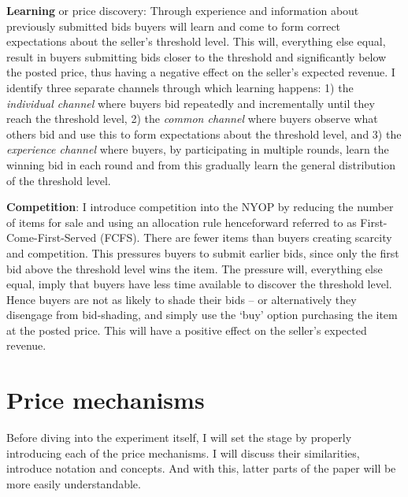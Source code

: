 \documentclass[a4paper,12pt]{article}
\begin{document}
{\bf Learning} or price discovery: Through experience and information about previously submitted bids buyers will learn and come to form correct expectations about the seller's threshold level. This will, everything else equal, result in buyers submitting bids closer to the threshold and significantly below the posted price, thus having a negative effect on the seller's expected revenue. I identify three separate channels through which learning happens: 1) the \emph{individual channel} where buyers bid repeatedly and incrementally until they reach the threshold level, 2) the \emph{common channel} where buyers observe what others bid and use this to form expectations about the threshold level, and 3) the \emph{experience channel} where buyers, by participating in multiple rounds, learn the winning bid in each round and from this gradually learn the general distribution of the threshold level.

{\bf Competition}: I introduce competition into the NYOP by reducing the number of items for sale and using an allocation rule henceforward referred to as First-Come-First-Served (FCFS). There are fewer items than buyers creating scarcity and competition. This pressures buyers to submit earlier bids, since only the first bid above the threshold level wins the item. The pressure will, everything else equal, imply that buyers have less time available to discover the threshold level. Hence buyers are not as likely to shade their bids -- or alternatively they disengage from bid-shading, and simply use the `buy' option purchasing the item at the posted price. This will have a positive effect on the seller's expected revenue.


	\section{Price mechanisms}

	Before diving into the experiment itself, I will set the stage by properly introducing each of the price mechanisms. I will discuss their similarities, introduce notation and concepts. And with this, latter parts of the paper will be more easily understandable.
\end{document}
